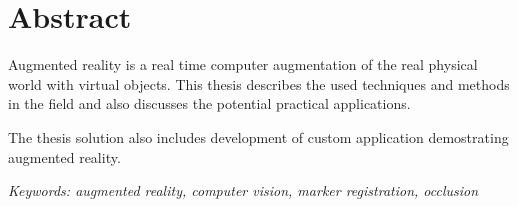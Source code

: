 \thispagestyle{empty}
\chapter*{Abstract}
Augmented reality is a real time computer augmentation of the real physical world with virtual objects. This thesis describes the used techniques and methods in the field and also discusses the potential practical applications. \par

The thesis solution also includes development of custom application demostrating augmented reality. \par

\emph{Keywords: augmented reality, computer vision, marker registration, occlusion}
\pagebreak